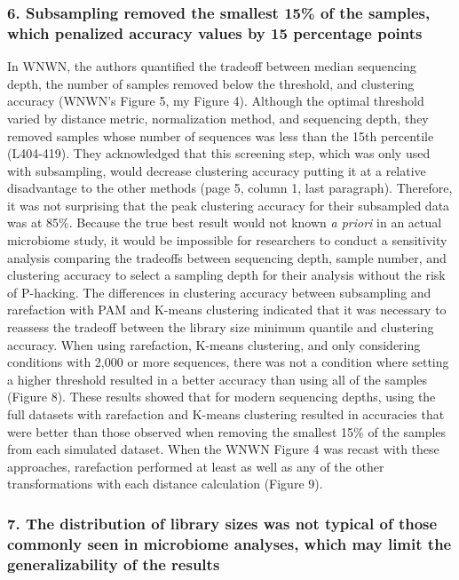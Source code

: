 \documentclass[
]{article}
\begin{document}
\hypertarget{subsampling-removed-the-smallest-15-of-the-samples-which-penalized-accuracy-values-by-15-percentage-points}{%
\subsubsection{6. Subsampling removed the smallest 15\% of the samples,
which penalized accuracy values by 15 percentage
points}\label{subsampling-removed-the-smallest-15-of-the-samples-which-penalized-accuracy-values-by-15-percentage-points}}

In WNWN, the authors quantified the tradeoff between median sequencing
depth, the number of samples removed below the threshold, and clustering
accuracy (WNWN's Figure 5, my Figure 4). Although the optimal threshold
varied by distance metric, normalization method, and sequencing depth,
they removed samples whose number of sequences was less than the 15th
percentile (L404-419). They acknowledged that this screening step, which
was only used with subsampling, would decrease clustering accuracy
putting it at a relative disadvantage to the other methods (page 5,
column 1, last paragraph). Therefore, it was not surprising that the
peak clustering accuracy for their subsampled data was at 85\%. Because
the true best result would not known \emph{a priori} in an actual
microbiome study, it would be impossible for researchers to conduct a
sensitivity analysis comparing the tradeoffs between sequencing depth,
sample number, and clustering accuracy to select a sampling depth for
their analysis without the risk of P-hacking. The differences in
clustering accuracy between subsampling and rarefaction with PAM and
K-means clustering indicated that it was necessary to reassess the
tradeoff between the library size minimum quantile and clustering
accuracy. When using rarefaction, K-means clustering, and only
considering conditions with 2,000 or more sequences, there was not a
condition where setting a higher threshold resulted in a better accuracy
than using all of the samples (Figure 8). These results showed that for
modern sequencing depths, using the full datasets with rarefaction and
K-means clustering resulted in accuracies that were better than those
observed when removing the smallest 15\% of the samples from each
simulated dataset. When the WNWN Figure 4 was recast with these
approaches, rarefaction performed at least as well as any of the other
transformations with each distance calculation (Figure 9).

\hypertarget{the-distribution-of-library-sizes-was-not-typical-of-those-commonly-seen-in-microbiome-analyses-which-may-limit-the-generalizability-of-the-results}{%
\subsubsection{7. The distribution of library sizes was not typical of
those commonly seen in microbiome analyses, which may limit the
generalizability of the
results}\label{the-distribution-of-library-sizes-was-not-typical-of-those-commonly-seen-in-microbiome-analyses-which-may-limit-the-generalizability-of-the-results}}
\end{document}

